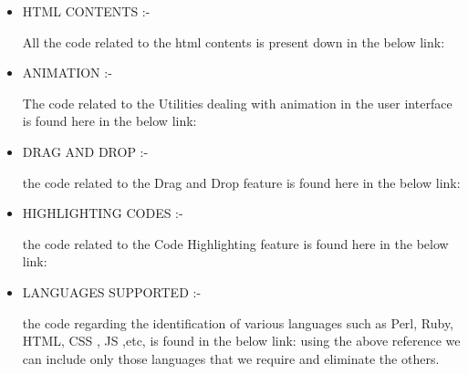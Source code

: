 \begin{itemize}
\begin{enumerate}
\begin{center}
[\url{https://github.com/adobe/brackets/blob/master/src/editor/CodeHintList.js}]
\end{center}
\item Image Viewer:
\begin{center}  the code realted to the uploaded image link given while writing the code is found in
the below link: 
\end{center}
\end{enumerate}
\item HTML CONTENTS :- \newline
\begin{center}
All the code related to the html contents is present down in the below link: 
\end{center}
\item ANIMATION :- \newline
\begin{center}
The code related to the Utilities dealing with animation in the user interface is found
here in the below link: 
\end{center}
\item DRAG AND DROP :- \newline
\begin{center}
the code related to the Drag and Drop feature is found here in the below link: 
\end{center}
\item HIGHLIGHTING CODES :- \newline
\begin{center}
the code related to the Code Highlighting feature is found here in the below link: 
\end{center}
\item LANGUAGES SUPPORTED :- \newline
\begin{center}
the code regarding the identification of various languages such as Perl, Ruby,
HTML, CSS , JS ,etc, is found in the below link: 
\newline  using the above reference we can include only those languages that we require and
eliminate the others.
\end{center}
\end{itemize}
